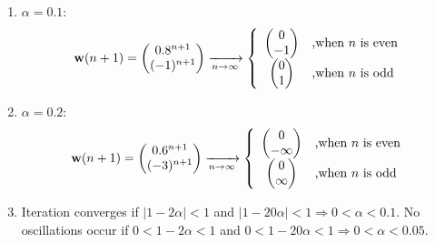 \begin{enumerate}
\begin{solution}
\begin{enumerate}
    \item $\alpha = 0.1$: 
      \begin{equation*}
        {\bf{w}}(n+1) = \begin{pmatrix} 0.8^{n+1} \\
          (-1)^{n+1} \end{pmatrix} \xrightarrow[n\rightarrow\infty]{}\left\{\begin{array}{cl}\begin{pmatrix}0\\-1\end{pmatrix} & \mbox{,when } n\mbox{ is even}\\
            \begin{pmatrix}0\\1\end{pmatrix} & \mbox{,when } n\mbox{ is odd}\end{array}\right.
      \end{equation*}

    \item $\alpha = 0.2$: 
      \begin{equation*}
        {\bf{w}}(n+1) = \begin{pmatrix} 0.6^{n+1} \\
          (-3)^{n+1} \end{pmatrix} \xrightarrow[n\rightarrow\infty]{}\left\{\begin{array}{cl}\begin{pmatrix}0\\-\infty\end{pmatrix} & \mbox{,when } n\mbox{ is even}\\
            \begin{pmatrix}0\\\infty\end{pmatrix} & \mbox{,when } n\mbox{ is odd}\end{array}\right.
      \end{equation*}

    \item Iteration converges if $| 1 - 2 \alpha | < 1$ and $| 1 - 20 \alpha | < 1 \Rightarrow 0 < \alpha < 0.1$. 
      No oscillations occur if $0 < 1 - 2 \alpha < 1$ and $0 < 1 - 20 \alpha < 1 \Rightarrow 0 < \alpha < 0.05$.

    \end{enumerate}

  \end{solution}


\end{enumerate}
